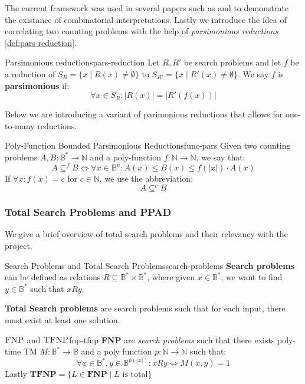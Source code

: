 The current framework was used in several papers such as
\cite{ikenmeyer_WhatWhatNot_2022} and \cite{ikenmeyer_PositivitySymmetricGroup_2024}
to demonstrate the existance of combinatorial interpretations.
Lastly we introduce the idea of correlating two counting problems with the help of
\textit{parsimonious reductions} \ref{def:pars-reduction}.


\begin{definitionbox}{Parsimonious reductions}{pars-reduction}
    Let $R, R'$ be search problems and let $f$ be a reduction of
    $S_R = \{x \mid R(x) \neq \emptyset \}$ to $S_{R'} = \{x \mid R'(x) \neq \emptyset \}$.
    We say $f$ is \textbf{parsimonious} if:
    $$
    \forall x \in S_R : |R(x)| = |R'(f(x))|
    $$ 
\end{definitionbox}

Below we are introducing a variant of parimonious reductions that allows
for one-to-many reductions. 
\begin{definitionbox}{Poly-Function Bounded Parsimonious Reductions}{func-pars}
    Given two counting problems $A, B : \mathbb{B}^* \to \mathbb{N}$
    and a poly-function $f : \mathbb{N} \to \mathbb{N}$, we
    say that:
    $$
    A \subseteq^f B \iff \forall x \in \mathbb{B}^n:  A(x) \leq B(x) \leq f(|x|) \cdot A(x)
    $$
    If $\forall x : f(x) = c$ for $c \in \mathbb{N}$, we use the abbreviation:
    $$
    A \subseteq^c B
    $$
\end{definitionbox}

\subsubsection{Total Search Problems and PPAD}
We give a brief overview of total search problems and their relevancy with the project.

\begin{definitionbox}{Search Problems and Total Search Problems}{search-problems}
    \textbf{Search problems} can be defined as relations $R \subseteq \mathbb{B}^* \times \mathbb{B}^*$,
    where given $x \in \mathbb{B}^*$, we want to find $y \in \mathbb{B}^*$  such that $xRy$.

    \textbf{Total Search problems} are search problems such that for each input, there must exist at least one solution.
\end{definitionbox}


\begin{definitionbox}{$\textnormal{\textsc{FNP}}$ and $\textnormal{\textsc{TFNP}}$}{fnp-tfnp}
    \textbf{FNP} are \textit{search problems} such that there exists poly-time TM $M: \mathbb{B}^* \to \mathbb{B}$
    and a poly function $p : \mathbb{N} \to \mathbb{N}$ such that:
    $$
    \forall x \in \mathbb{B}^*, y \in \mathbb{B}^{p(|x|)}: xRy \iff M(x,y) = 1
    $$
    Lastly $\textbf{TFNP} = \{L \in \textbf{FNP} \mid L \text{ is total}\}$
\end{definitionbox}
 

